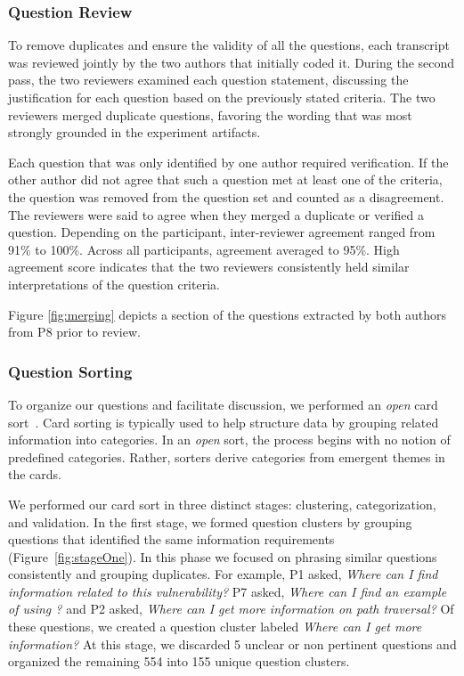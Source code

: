 \documentclass[conference]{IEEEtran}
\begin{document}
\subsubsection{Question Review}
To remove duplicates and ensure the validity of all the questions, each transcript was reviewed jointly by the two authors that initially coded it.
During the second pass, the two reviewers examined each question statement, discussing the justification for each question based on the previously stated criteria.
The two reviewers merged duplicate questions, favoring the wording that was most strongly grounded in the experiment artifacts.

Each question that was only identified by one author required verification.
If the other author did not agree that such a question met at least one of the criteria, the question was removed from the question set and counted as a disagreement.
The reviewers were said to agree when they merged a duplicate or verified a question. Depending on the participant, inter-reviewer agreement ranged from 91\% to 100\%. Across all participants, agreement averaged to 95\%.
High agreement score indicates that the two reviewers consistently held similar interpretations of the question criteria.


Figure \ref{fig:merging} depicts a section of the questions extracted by both authors from P8 prior to review.

\subsubsection{Question Sorting}
To organize our questions and facilitate discussion, we performed an \textit{open} card sort~\cite{hudson2013sorting}. 
Card sorting is typically used to help structure data by grouping related information into categories. 
In an \textit{open} sort, the process begins with no notion of predefined categories. 
Rather, sorters derive categories from emergent themes in the cards. 


We performed our card sort in three distinct stages: clustering, categorization, and validation.
In the first stage, we formed question clusters by grouping questions that identified the same information requirements (Figure~\ref{fig:stageOne}). 
In this phase we focused on phrasing similar questions consistently and grouping duplicates.
For example, P1 asked, \textit{Where can I find information related to this vulnerability?} P7 asked, \textit{Where can I find an example of using ?} and P2 asked, \textit{Where can I get more information on path traversal?} 
Of these questions, we created a question cluster labeled \textit{Where can I get more information?}
At this stage, we discarded 5 unclear or non pertinent questions and organized the remaining 554 into 155 unique question clusters.
\end{document}
